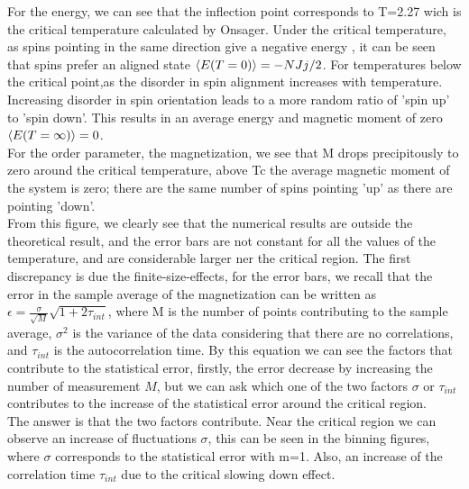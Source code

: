 \documentclass[article]{revtex4}
\newcommand{\qdist}[1]{\ifmmode\langle#1\rangle\else\textlangle#1\textrangle\fi}
\begin{document}
For the energy, we can see that the inflection point corresponds to T=2.27 wich is the critical temperature calculated by Onsager. Under the critical temperature, 
as spins pointing in the same direction give a negative energy , 
it can be seen that spins prefer an aligned state $\qdist{E(T=0)} = -NJj/2$.
 For temperatures below the critical point,as the disorder in spin alignment increases with temperature. 
Increasing disorder in spin orientation leads to a more random ratio of 'spin up' to 'spin down'. This results in an average energy and magnetic moment of zero $\qdist{E(T=\infty)} = 0$.\\
For the order parameter, the magnetization, we see that M drops precipitously to zero around the critical temperature, above Tc the average magnetic moment of the system is zero; 
there are the same number of spins pointing 'up' as there are pointing 'down'.\\ 
From this figure, we clearly see that the numerical results are outside the theoretical result, and the error bars are not constant for all the values
of the temperature, and are considerable larger ner the critical region. The first discrepancy is due the finite-size-effects, for the error bars, we recall that the
error in the sample average of the magnetization can be written as $\epsilon = \frac{\sigma}{\sqrt{M}}\sqrt{1+2\tau_{int}}$,
where M is the number of points contributing to the sample average, $\sigma^2$ is the variance of the data considering that there 
are no correlations, and $\tau_{int}$ is the autocorrelation time. By this equation we can see the factors that contribute to the statistical
error, firstly, the error decrease by increasing the number of measurement $M$, but we can ask which one of the two factors
$\sigma$ or $\tau_{int}$ contributes to the increase of the statistical error around the critical region.\\
The answer is that the two factors contribute. Near the critical region we can observe an increase of fluctuations $\sigma$, this can be seen in the binning figures, where $\sigma$ corresponds to the statistical error with m=1. Also, an 
increase of the correlation time $\tau_{int}$ due to the critical slowing down effect.
\\
\end{document}
